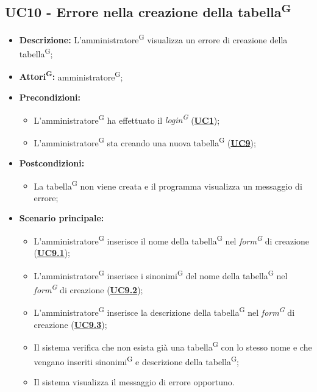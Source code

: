\subsection{UC10 - Errore nella creazione della tabella\textsuperscript{G}}
\label{sec:UC10}
\begin{itemize}
	\item \textbf{Descrizione:} L’amministratore\textsuperscript{G} visualizza un errore di creazione della tabella\textsuperscript{G};
	\item \textbf{Attori\textsuperscript{G}:} amministratore\textsuperscript{G};
	\item \textbf{Precondizioni:} 
	\begin{itemize}
		\item L’amministratore\textsuperscript{G} ha effettuato il \textit{login\textsuperscript{G}} (\hyperref[sec:UC1]{\textbf{UC1}});
		\item L’amministratore\textsuperscript{G} sta creando una nuova tabella\textsuperscript{G} (\hyperref[sec:UC9]{\textbf{UC9}});
	\end{itemize}
	\item \textbf{Postcondizioni:} 
	\begin{itemize}
		\item La tabella\textsuperscript{G} non viene creata e il programma visualizza un messaggio di errore;
	\end{itemize}
	\item \textbf{Scenario principale:} 
	\begin{itemize}
		\item L’amministratore\textsuperscript{G} inserisce il nome della tabella\textsuperscript{G} nel \textit{form\textsuperscript{G}} di creazione (\hyperref[sec:UC9.1]{\textbf{UC9.1}});
		\item L’amministratore\textsuperscript{G} inserisce i sinonimi\textsuperscript{G} del nome della tabella\textsuperscript{G} nel \textit{form\textsuperscript{G}} di creazione (\hyperref[sec:UC9.2]{\textbf{UC9.2}});
		\item L’amministratore\textsuperscript{G} inserisce la descrizione della tabella\textsuperscript{G} nel \textit{form\textsuperscript{G}} di creazione (\hyperref[sec:UC9.3]{\textbf{UC9.3}});
		\item Il sistema verifica che non esista già una tabella\textsuperscript{G} con lo stesso nome e che vengano inseriti sinonimi\textsuperscript{G} e descrizione della tabella\textsuperscript{G};
		\item Il sistema visualizza il messaggio di errore opportuno.
	\end{itemize}
\end{itemize}

